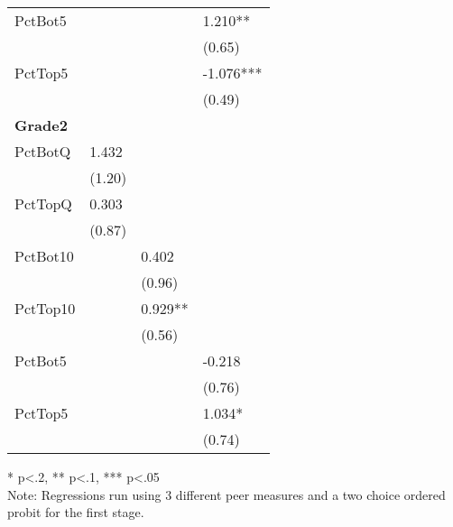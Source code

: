 \begin{table}[!htb]
\begin{threeparttable}
\begin{tabular}{l l l l}
      PctBot5         &                               &                               & 1.210**                      \\
                      &                               &                               & (0.65)                       \\
      PctTop5         &                               &                               & -1.076***                    \\
                      &                               &                               & (0.49)                       \\
      \hline
      \textbf{Grade2} &                               &                               &                              \\
      PctBotQ         & 1.432                         &                               &                              \\
                      & (1.20)                        &                               &                              \\
      PctTopQ         & 0.303                         &                               &                              \\
                      & (0.87)                        &                               &                              \\
      PctBot10        &                               & 0.402                         &                              \\
                      &                               & (0.96)                        &                              \\
      PctTop10        &                               & 0.929**                       &                              \\
                      &                               & (0.56)                        &                              \\
      PctBot5         &                               &                               & -0.218                       \\
                      &                               &                               & (0.76)                       \\
      PctTop5         &                               &                               & 1.034*                       \\
                      &                               &                               & (0.74)                       \\
      \hline
      \hline
    \end{tabular}
    \begin{tablenotes}
    \item{* p<.2, ** p<.1, *** p<.05 \\Note: Regressions run using 3 different peer measures and a two choice ordered probit for the first stage.}
    \end{tablenotes}
  \end{threeparttable}
\end{table}

